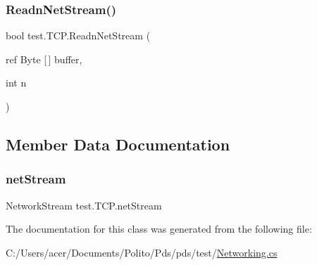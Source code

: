 \subsubsection{\texorpdfstring{Readn\+Net\+Stream()}{ReadnNetStream()}}
{\footnotesize\ttfamily bool test.\+T\+C\+P.\+Readn\+Net\+Stream (\begin{DoxyParamCaption}\item[{ref Byte \mbox{[}$\,$\mbox{]}}]{buffer,  }\item[{int}]{n }\end{DoxyParamCaption})}



\subsection{Member Data Documentation}
\mbox{\label{classtest_1_1_t_c_p_adbaa960d60637651d5fe2b67aba975d7}} 
\subsubsection{\texorpdfstring{net\+Stream}{netStream}}
{\footnotesize\ttfamily Network\+Stream test.\+T\+C\+P.\+net\+Stream\hspace{0.3cm}{\ttfamily [protected]}}



The documentation for this class was generated from the following file\+:\begin{DoxyCompactItemize}
\item 
C\+:/\+Users/acer/\+Documents/\+Polito/\+Pds/pds/test/\hyperlink{_networking_8cs}{Networking.\+cs}\end{DoxyCompactItemize}
